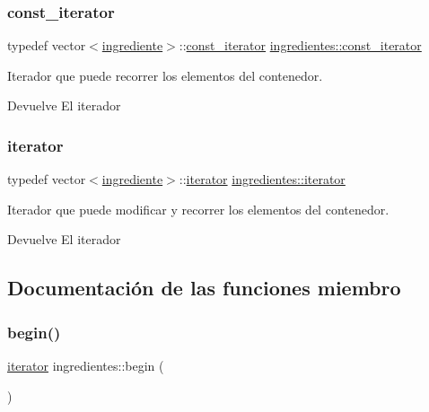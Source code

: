 \subsubsection{\texorpdfstring{const\+\_\+iterator}{const\_iterator}}
{\footnotesize\ttfamily typedef vector$<$\hyperlink{classingrediente}{ingrediente}$>$\+::\hyperlink{classingredientes_ac84040efbb789929ebe9177605bb890a}{const\+\_\+iterator} \hyperlink{classingredientes_ac84040efbb789929ebe9177605bb890a}{ingredientes\+::const\+\_\+iterator}}



Iterador que puede recorrer los elementos del contenedor. 

\begin{DoxyReturn}{Devuelve}
El iterador 
\end{DoxyReturn}
\mbox{\label{classingredientes_af0cadce160cefe5482ca7d55ef86c893}} 
\subsubsection{\texorpdfstring{iterator}{iterator}}
{\footnotesize\ttfamily typedef vector$<$\hyperlink{classingrediente}{ingrediente}$>$\+::\hyperlink{classingredientes_af0cadce160cefe5482ca7d55ef86c893}{iterator} \hyperlink{classingredientes_af0cadce160cefe5482ca7d55ef86c893}{ingredientes\+::iterator}}



Iterador que puede modificar y recorrer los elementos del contenedor. 

\begin{DoxyReturn}{Devuelve}
El iterador 
\end{DoxyReturn}


\subsection{Documentación de las funciones miembro}
\mbox{\label{classingredientes_a9d61c6347e216b9f99264982ad8e6074}} 
\subsubsection{\texorpdfstring{begin()}{begin()}}
{\footnotesize\ttfamily \hyperlink{classingredientes_af0cadce160cefe5482ca7d55ef86c893}{iterator} ingredientes\+::begin (\begin{DoxyParamCaption}{ }\end{DoxyParamCaption})\hspace{0.3cm}{\ttfamily [inline]}}



